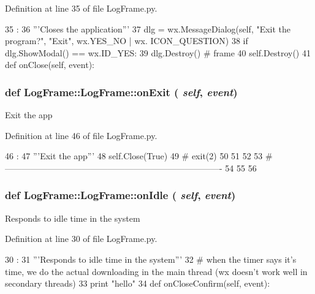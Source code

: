 Definition at line 35 of file LogFrame.py.


\begin{DoxyCode}
35                                    :
36         '''Closes the application'''
37         dlg = wx.MessageDialog(self, "Exit the program?", "Exit", wx.YES_NO | wx.
      ICON_QUESTION)
38         if dlg.ShowModal() == wx.ID_YES:
39             dlg.Destroy()  # frame
40         self.Destroy()
41 
    def onClose(self, event):
\end{DoxyCode}
\hypertarget{classLogFrame_1_1LogFrame_a5db4211e2790c9f6f09e6c2cecc144b2}{
\subsubsection[{onExit}]{\setlength{\rightskip}{0pt plus 5cm}def LogFrame::LogFrame::onExit ( {\em self}, \/   {\em event})}}
\label{classLogFrame_1_1LogFrame_a5db4211e2790c9f6f09e6c2cecc144b2}
\begin{DoxyVerb}Exit the app\end{DoxyVerb}
 

Definition at line 46 of file LogFrame.py.


\begin{DoxyCode}
46                            :
47         '''Exit the app'''
48         self.Close(True)
49 #        exit(2)
50 
51 
52 
53 #----------------------------------------------------------------------------
54 
55 
56 

\end{DoxyCode}
\hypertarget{classLogFrame_1_1LogFrame_ad4fa2b05a213e2899ce5bdce7d02d23f}{
\subsubsection[{onIdle}]{\setlength{\rightskip}{0pt plus 5cm}def LogFrame::LogFrame::onIdle ( {\em self}, \/   {\em event})}}
\label{classLogFrame_1_1LogFrame_ad4fa2b05a213e2899ce5bdce7d02d23f}
\begin{DoxyVerb}Responds to idle time in the system\end{DoxyVerb}
 

Definition at line 30 of file LogFrame.py.


\begin{DoxyCode}
30                            :
31         '''Responds to idle time in the system'''
32         # when the timer says it's time, we do the actual downloading in the main
       thread (wx doesn't work well in secondary threads)
33         print "hello"
34         
    def onCloseConfirm(self, event):
\end{DoxyCode}


